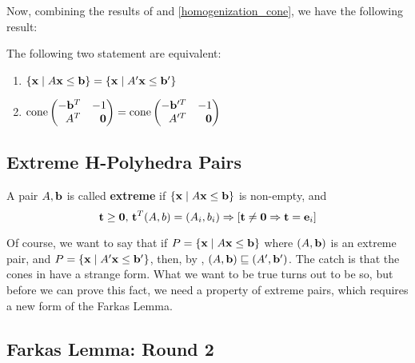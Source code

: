 Now, combining the results of  and \cref{homogenization_cone}, we have the following result:

\begin{Prop}\label{dual_homogenization_cone}
	The following two statement are equivalent:
	\begin{enumerate}
		\item $\left\{\mathbf{x}\;|\; A\mathbf{x}\leq \mathbf{b}\right\} = \left\{\mathbf{x}\;|\; A'\mathbf{x}\leq \mathbf{b}'\right\}$
		\item $\cone \pmb -\b^T & -1 \\ A^T & \0 \pme = \cone \pmb -\b'^T & -1 \\ A'^T & \0 \pme$
	\end{enumerate}
\end{Prop}

\subsection{Extreme H-Polyhedra Pairs}
\begin{Def}{
		A pair $A,\mathbf{b}$ is called \textbf{extreme} if $\left\{\mathbf{x}\;|\; A\mathbf{x}\leq \mathbf{b}\right\}$ is non-empty, and
		\[ \mathbf{t} \geq \mathbf{0},\, \mathbf{t}^T(A,b) = (A_i,b_i) \Rightarrow [\mathbf{t} \neq \mathbf{0} \Rightarrow \mathbf{t} = \mathbf{e}_i] \]
	}\end{Def}

Of course, we want to say that if $P = \left\{\mathbf{x}\;|\; A\mathbf{x}\leq \mathbf{b}\right\}$ where $(A,\mathbf{b})$ is an extreme pair, and $P = \left\{\mathbf{x}\;|\; A'\mathbf{x}\leq \mathbf{b}'\right\}$, then, by , $(A,\mathbf{b}) \sqsubseteq (A',\mathbf{b}')$.  The catch is that the cones in  have a strange form.  What we want to be true turns out to be so, but before we can prove this fact, we need a property of extreme pairs, which requires a new form of the Farkas Lemma.

\subsection{Farkas Lemma: Round 2}

